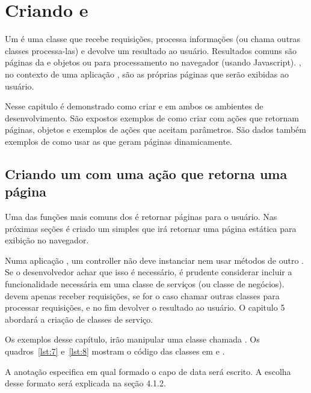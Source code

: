 \chapter{Criando  e }

Um  é uma classe que  recebe requisições, processa informações (ou chama outras classes processa-las) e devolve um resultado ao usuário. Resultados comuns são páginas da  e objetos  ou  para processamento no navegador (usando Javascript). , no contexto de uma aplicação , são as próprias páginas que serão exibidas ao usuário.

Nesse capitulo é demonstrado como criar  e  em ambos os ambientes de desenvolvimento. São expostos exemplos de como criar  com ações que retornam páginas, objetos  e exemplos de ações que aceitam parâmetros. São dados também exemplos de como usar as  que geram páginas  dinamicamente.

\section{Criando um  com uma ação que retorna uma página}

Uma das funções mais comuns dos  é retornar páginas para o usuário. Nas próximas seções é criado um  simples que irá retornar uma página estática para exibição no navegador.

Numa aplicação , um controller não deve instanciar nem usar métodos de outro . Se o desenvolvedor achar que isso é necessário, é prudente considerar incluir a funcionalidade necessária em uma classe de serviços (ou classe de negócios).  devem apenas receber requisições, se for o caso chamar outras classes para processar requisições, e no fim devolver o resultado ao usuário. O capitulo 5 abordará a criação de classes de serviço.

Os exemplos desse capítulo, irão manipular uma classe chamada . Os quadros~\ref{lst:7} e~\ref{lst:8} mostram o código das classes em  e .


A anotação  especifica em qual formado o capo de data será escrito. A escolha desse formato será explicada na seção 4.1.2.

